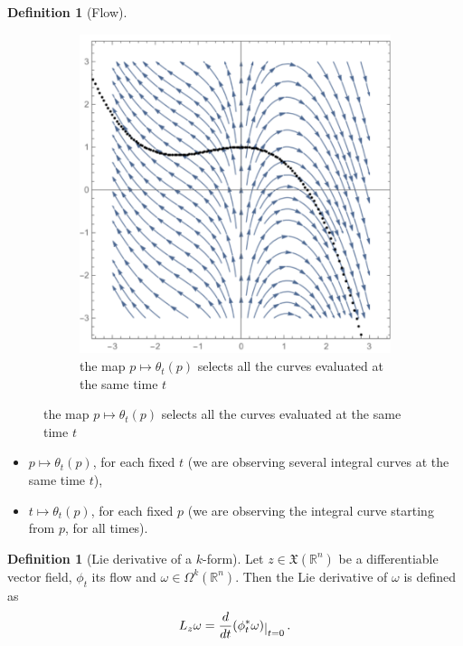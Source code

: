 \documentclass[a4paper,11pt,titlepage, article, oneside]{memoir}
\numberwithin{equation}{section}
\theoremstyle{definition}
\newtheorem{definition}[theorem]{Definition}
\theoremstyle{remark}
\newcommand{\rfield}{\mathbb{R}}
\newcommand{\restrict}[2]{{#1}\raisebox{-.5ex}{$|$}_{#2}}
\begin{document}
\begin{definition}[Flow]
\begin{figure}[H]
\begin{subfigure}{.45\textwidth}
\end{subfigure}
\begin{subfigure}{.45\textwidth}
     \centering
     \vspace{0.4em}
     \includegraphics[width=0.95\linewidth]{Images/integralcurve_2.pdf}
     \caption{the map $p \mapsto \theta_t(p)$ selects all the curves evaluated at the same time $t$} \label{Fig:integralcurve_2}
\end{subfigure}
\end{figure}
\begin{itemize}
\item $p \mapsto \theta_t(p)$, for each fixed $t$ (we are observing several integral curves at the same time $t$),
\item $t \mapsto \theta_t(p)$, for each fixed $p$ (we are observing the integral curve starting from $p$, for all times).
\end{itemize}
\end{definition}

\begin{definition}[Lie derivative of a $k$-form]
  Let $z \in \mathfrak{X}(\rfield^n)$ be a differentiable vector field, $\phi_t$ its flow and $\omega \in \Omega^k(\rfield^n)$. Then the Lie derivative of $\omega$ is defined as
  \begin{equation}
    L_z \omega = \restrict{\frac{d}{dt}(\phi_t^* \omega)}{t=0} \, .
  \end{equation}
\end{definition}
\end{document}
